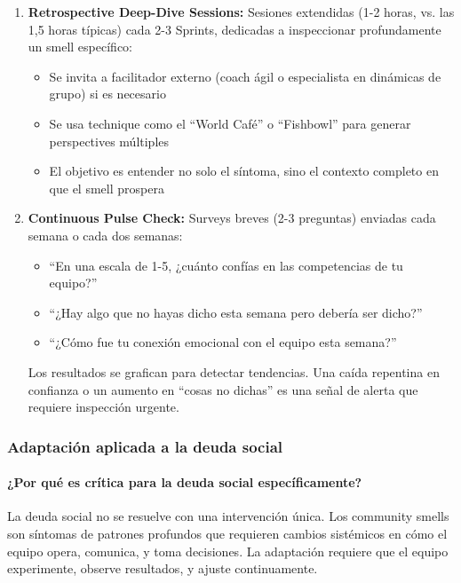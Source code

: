 \begin{enumerate}
\item \textbf{Retrospective Deep-Dive Sessions:} Sesiones extendidas (1-2 horas, vs. las 1,5 horas típicas) cada 2-3 Sprints, dedicadas a inspeccionar profundamente un smell específico:
\begin{itemize}
\item Se invita a facilitador externo (coach ágil o especialista en dinámicas de grupo) si es necesario
\item Se usa technique como el ``World Café'' o ``Fishbowl'' para generar perspectives múltiples
\item El objetivo es entender no solo el síntoma, sino el contexto completo en que el smell prospera
\end{itemize}

\item \textbf{Continuous Pulse Check:} Surveys breves (2-3 preguntas) enviadas cada semana o cada dos semanas:
\begin{itemize}
\item ``En una escala de 1-5, ¿cuánto confías en las competencias de tu equipo?''
\item ``¿Hay algo que no hayas dicho esta semana pero debería ser dicho?''
\item ``¿Cómo fue tu conexión emocional con el equipo esta semana?''
\end{itemize}

Los resultados se grafican para detectar tendencias. Una caída repentina en confianza o un aumento en ``cosas no dichas'' es una señal de alerta que requiere inspección urgente.

\end{enumerate}

\subsubsection{Adaptación aplicada a la deuda social}

\paragraph{¿Por qué es crítica para la deuda social específicamente?}

La deuda social no se resuelve con una intervención única. Los community smells son síntomas de patrones profundos que requieren cambios sistémicos en cómo el equipo opera, comunica, y toma decisiones. La adaptación requiere que el equipo experimente, observe resultados, y ajuste continuamente.

